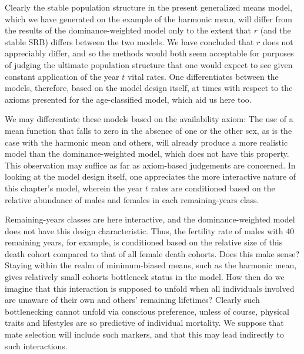 \FloatBarrier

Clearly the stable population structure in the present generalized means model,
which we have generated on the example of the harmonic mean, will differ from
the results of the dominance-weighted model only to the extent that $r$ (and
the stable SRB) differs between the two models. We have concluded that $r$ does
not appreciably differ, and so the methods would both seem acceptable for
purposes of judging the ultimate population structure that one would expect to
see given constant application of the year $t$ vital rates. One differentiates
between the models, therefore, based on the model design itself, at times with
respect to the axioms presented for the age-classified model, which aid us here
too. 

We may differentiate these models based on the availability axiom:  The use of
a mean function that falls to zero in the absence of one or the other sex, as is the 
case with the harmonic mean and others, will already produce a more
realistic model than the dominance-weighted model, which does not have this
property. This observation may suffice as far as axiom-based
judgements are concerned. In looking at the model design itself, one appreciates
the more interactive nature of this chapter's model, wherein the year $t$ rates
are conditioned based on the relative abundance of males and females in each
remaining-years class. 

Remaining-years classes are here interactive, and
the dominance-weighted model does not have this design characteristic. Thus, the
fertility rate of males with 40 remaining years, for example, is conditioned
based on the relative size of this death cohort compared to that of all female
death cohorts. Does this make sense? Staying within the realm of minimum-biased
means, such as the harmonic mean, gives relatively small cohorts
bottleneck status in the model. How then do we imagine that this interaction is
supposed to unfold when all individuals involved are unaware of their own and
others' remaining lifetimes? Clearly such bottlenecking cannot unfold
via conscious preference, unless of course, physical traits and lifestyles are
so predictive of individual mortality. We suppose that mate selection will
include such markers, and that this may lead indirectly to such interactions.

